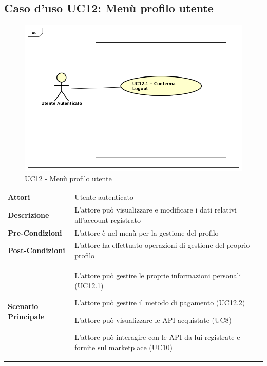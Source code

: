 \newpage
\subsection{Caso d'uso UC12: Menù profilo utente}
\label{UC12}

\begin{figure}[ht]
	\centering
	\includegraphics[scale=0.45]{UML/UC12.png}
	\caption{UC12 - Menù profilo utente}
\end{figure}
\FloatBarrier
\begin{longtable}{ l | p{11cm}}
	\hline
	\rowcolor{Gray}
	 \multicolumn{2}{c}{UC12 - Menù profilo utente} \\
	 \hline
	 \textbf{Attori} & Utente autenticato  \\
	\textbf{Descrizione} & L’attore può visualizzare e modificare i dati relativi all'account registrato \\
	\textbf{Pre-Condizioni} & L’attore è nel menù per la gestione del profilo \\
	\textbf{Post-Condizioni} & L’attore ha effettuato operazioni di gestione del proprio profilo \\
	\textbf{Scenario Principale} & 
	\begin{enumerate*}[label=(\arabic*.),itemjoin={\newline}]
		\item L'attore può gestire le proprie informazioni personali (UC12.1)
		\item L'attore può gestire il metodo di pagamento (UC12.2)
		\item L'attore può visualizzare le API acquistate (UC8)
		\item L'attore può interagire con le API da lui registrate e fornite sul marketplace (UC10)
	\end{enumerate*}\\
\end{longtable}

